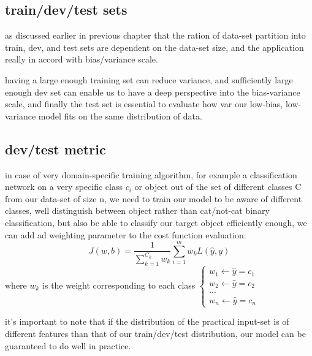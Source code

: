 \documentclass[4apaper,12pt]{book}
\begin{document}
\begin{description}
    \section{train/dev/test sets}
    \begin{description}
    \item as discussed earlier in previous chapter that the ration of data-set partition into train, dev, and test sets are dependent on the data-set size, and the application really in accord with bias/variance scale.
    \item having a large enough training set can reduce variance, and sufficiently large enough dev set can enable us to have a deep perspective into the bias-variance scale, and finally the test set is essential to evaluate how var our low-bias, low-variance model fits on the same distribution of data.
      \subsection {dev/test metric}
    \item in case of very domain-specific training algorithm, for example a classification network on a very specific class $c_i$ or object out of the set of different classes C from our data-set of size n, we need to train our model to be aware of different classes, well distinguish between object rather than cat/not-cat binary classification, but also be able to classify our target object efficiently enough, we can add ad weighting parameter to the cost function evaluation: $$ J(w,b)=\frac{1}{\sum_{k=1}^{C_k}{w_k}} \sum_{i=1}^{m}w_k L(\hat{y},y) $$ where $w_k$ is the weight corresponding to each class $\begin{cases}w_1 \leftarrow \hat{y}=c_1\\w_2 \leftarrow \hat{y}=c_2\\...\\w_n \leftarrow \hat{y}=c_n\end{cases}$
    \end{description}
    \item it's important to note that if the distribution of the practical input-set is of different features than that of our train/dev/test distribution, our model can be guaranteed to do well in practice.
  \end{description}
\end{document}
